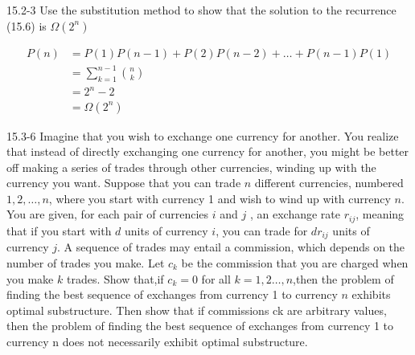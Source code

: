 

\usepackage{marginnote}




\homeworkheader{\classnameandsection}

\begin{problem}{15.2-3}
  Use the substitution method to show that the solution to the recurrence (15.6) is $\Omega(2^n)$
  \begin{solution}
    \begin{align*}
      P(n) &= P(1)P(n-1) + P(2)P(n-2) + \ldots + P(n-1)P(1) \\
           &= \displaystyle\sum\limits_{k = 1}^{n - 1} {n \choose k } \\
           &= 2^n - 2 \\
           &= \Omega(2^n)
    \end{align*}
  \end{solution}
\end{problem}

\begin{problem}{15.3-6}
  Imagine that you wish to exchange one currency for another. You realize that instead of directly exchanging one
  currency for another, you might be better off making a series of trades through other currencies, winding up with the
  currency you want. Suppose that you can trade $n$ different currencies, numbered $1, 2, \ldots, n$, where you start
  with currency 1 and wish to wind up with currency $n$. You are given, for each pair of currencies $i$ and $j$ , an
  exchange rate $r_{ij}$, meaning that if you start with $d$ units of currency $i$, you can trade for $dr_{ij}$ units of
  currency $j$. A sequence of trades may entail a commission, which depends on the number of trades you make. Let $c_k$
  be the commission that you are charged when you make $k$ trades. Show that,if $c_k = 0$ for all $k = 1,2
  \dots,n$,then the problem of finding the best sequence of exchanges from currency 1 to currency $n$ exhibits optimal
  substructure. Then show that if commissions ck are arbitrary values, then the problem of finding the best sequence of
  exchanges from currency 1 to currency n does not necessarily exhibit optimal substructure.
\end{problem}

